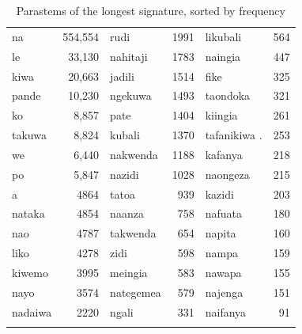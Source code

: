 \documentclass[output=paper,colorlinks,citecolor=brown]{langscibook}
\begin{document}
\begin{table}  

\begin{tabular}{*{3}{lr}} 
\lsptoprule 
na & 554,554 &          {rudi} & 1991 &          {li}{kubali}     & 564 \\ 
le & 33,130 &           {na}{hitaji} & 1783&     {na}{ingi}a    & 447 \\ 
ki{w}a & 20,663 &       {jadili} & 1514 &        {fik}e & 325 \\ 
pande & 10,230 &        {nge}ku{w}a & 1493 &     {ta}{ondok}a & 321 \\   
ko & 8,857 &            {pat}e & 1404 &          {ki}{ingi}a   & 261 \\ 
{ta}kuwa & 8,824 &      {kubali} & 1370 &        {ta}{fanikiw}a .  & 253  \\ 
we &6,440 &             {na}kw{end}a &  1188 &   {ka}{fany}a   & 218 \\ 
po & 5,847 &            {na}{zidi} & 1028 &      {na}{ongez}a   & 215 \\ 
a & 4864 &              {ta}{to}a & 939 &        {ka}{zidi}     & 203 \\ 
na{tak}a & 4854 &       {na}{anz}a & 758 &       {na}{fuat}a  & 180 \\ 
nao & 4787 &            {ta}kw{end}a  & 654  &   {na}{pit}a    & 160 \\ 
{li}ko & 4278 &         {zidi}& 598 &            {na}m{p}a    & 159 \\ 
kiwemo & 3995 &         {me}ingia    & 583 &     {na}wa{p}a    & 155 \\ 
nayo & 3574 &           {na}{tegemea}    & 579 & {na}{jeng}a    & 151 \\ 
{na}{daiw}a & 2220 &    ngali & 331 &            {na}i{fany}a    &91 \\ 
\lspbottomrule
\end{tabular}
\caption{Parastems of the longest signature, sorted by frequency\label{topsigstems}}
\end{table}
%
%
\end{document}
